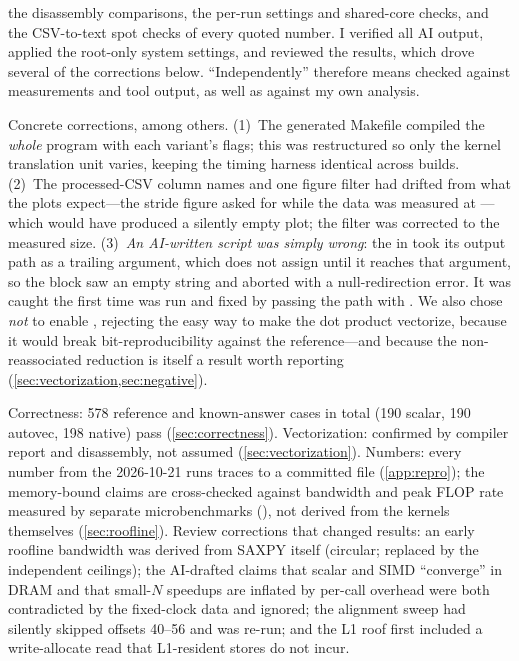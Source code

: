 \begin{description}[style=nextline]
        the disassembly comparisons, the per-run settings and shared-core checks, and the
        CSV-to-text spot checks of every quoted number. I verified all AI output, applied
        the root-only system settings, and reviewed the results,
        which drove several of the corrections below. ``Independently'' therefore means checked
        against measurements and tool output, as well as against my own analysis.
  \item[What was independently modified, tested, or rejected] Concrete corrections, among others.
        (1)~The generated Makefile compiled the \emph{whole} program with each variant's
        flags; this was restructured so only the kernel translation unit varies, keeping the
        timing harness identical across builds. (2)~The processed-CSV column names and one
        figure filter had drifted from what the plots expect---the stride figure asked for
         while the data was measured at ---which would have
        produced a silently empty plot; the filter was corrected to the measured size.
        (3)~\emph{An AI-written script was simply wrong}: the  in
         took its output path as a trailing 
        argument, which  does not assign until it reaches that argument, so the
         block saw an empty string and aborted with a null-redirection error. It
        was caught the first time  was run and fixed by passing the path
        with . We also chose \emph{not} to enable , rejecting the
        easy way to make the dot product vectorize, because it would break bit-reproducibility
        against the reference---and because the non-reassociated reduction is itself a result
        worth reporting (\cref{sec:vectorization,sec:negative}).
  \item[Validation] Correctness: \num{578} reference and known-answer cases in total
        (\num{190} scalar, \num{190} autovec, \num{198} native) pass (\cref{sec:correctness}).
        Vectorization: confirmed by compiler report and disassembly, not assumed
        (\cref{sec:vectorization}). Numbers: every number from the 2026-10-21 runs traces to a
        committed file (\cref{app:repro}); the memory-bound claims are
        cross-checked against bandwidth and peak FLOP rate measured by separate microbenchmarks
        (), not derived from the kernels themselves (\cref{sec:roofline}).
        Review corrections that changed results: an early roofline bandwidth was derived from
        SAXPY itself (circular; replaced by the independent ceilings); the AI-drafted claims that
        scalar and SIMD ``converge'' in DRAM and that small-$N$ speedups are inflated by per-call
        overhead were both contradicted by the fixed-clock data and ignored; the alignment sweep had
        silently skipped offsets \qtyrange{40}{56}{\byte} and was re-run; and the L1 roof first
        included a write-allocate read that L1-resident stores do not incur.
\end{description}

